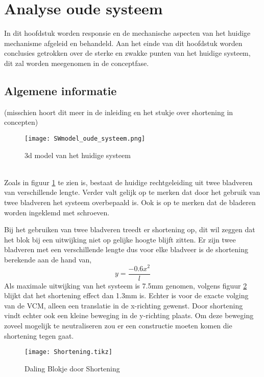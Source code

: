 \documentclass[a4paper]{article}
\begin{document}
\section{Analyse oude systeem}
In dit hoofdstuk worden responsie en de mechanische aspecten van het huidige mechanisme afgeleid en behandeld. Aan het einde van dit hoofdstuk worden conclusies getrokken over de sterke en zwakke punten van het huidige systeem, dit zal worden meegenomen in de conceptfase.

\subsection{Algemene informatie} (misschien hoort dit meer in de inleiding en het stukje over shortening in concepten)
\begin{figure}[h]
\label{oude_systeem}
\centering
\texttt{[image: SWmodel\_oude\_systeem.png]}
\caption{3d model van het huidige systeem}
\end{figure}
\\
Zoals in figuur \ref{oude_systeem} te zien is, bestaat de huidige rechtgeleiding uit twee bladveren van verschillende lengte. Verder valt gelijk op te merken dat door het gebruik van twee bladveren het systeem overbepaald is. Ook is op te merken dat de bladeren worden ingeklemd met schroeven.

Bij het gebruiken van twee bladveren treedt er shortening op, dit wil zeggen dat het blok bij een uitwijking niet op gelijke hoogte blijft zitten. Er zijn twee bladveren met een verschillende lengte dus voor elke bladveer is de shortening berekende aan de hand van,
\begin{equation}
y=\frac{-0.6x^2}{l}
\end{equation}
Als maximale uitwijking van het systeem is 7.5mm genomen, volgens figuur \ref{Shortening} blijkt dat het shortening effect dan 1.3mm is. Echter is voor de exacte volging van de VCM, alleen een translatie in de x-richting gewenst. Door shortening vindt echter ook een kleine beweging in de y-richting plaats. Om deze beweging zoveel mogelijk te neutraliseren zou er een constructie moeten komen die shortening tegen gaat. 
\begin{figure}[h]
\label{Shortening}
\centering
\setlength\figureheight{5cm}
\setlength{}
\texttt{[image: Shortening.tikz]}
\caption{Daling Blokje door Shortening}
\end{figure}


\clearpage
\end{document}

